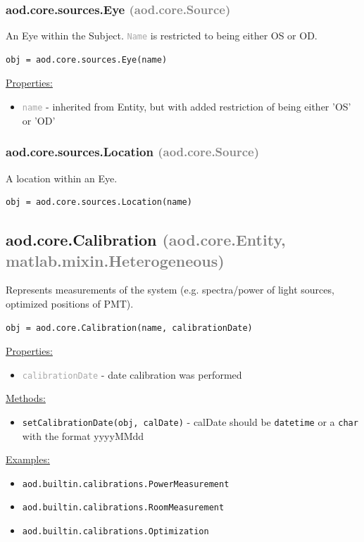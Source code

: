 \documentclass[10pt]{exam}
\newcommand\myparent[1]{\textcolor{gray}{(#1)}}
\newcommand\aodclass[1]{\textcolor{codeblue}{\texttt{#1}}}
\newcommand\aodprop[1]{\textcolor{darkgray}{\texttt{#1}}}
\newcommand\aodfcn[1]{\textcolor{darkteal}{\texttt{#1}}}
\newcommand\docheader[1]{\vspace{0.6ex}\noindent\underline{#1}\vspace{0.15ex}}
\begin{document}
		\subsubsection{aod.core.sources.Eye \textcolor{gray}{(aod.core.Source)}}
			\noindent An Eye within the Subject. \aodprop{Name} is restricted to being either OS or OD.
			\begin{lstlisting}[style=matlab-editor, basicstyle=\mlttfamily\footnotesize]
obj = aod.core.sources.Eye(name)
			\end{lstlisting} 
			\docheader{Properties:}
			\begin{itemize}
				\item \aodprop{name} - inherited from Entity, but with added restriction of being either 'OS' or 'OD'
			\end{itemize}
			
		\subsubsection{aod.core.sources.Location  	\textcolor{gray}{(aod.core.Source)}}
			\noindent A location within an Eye.
			\begin{lstlisting}[style=matlab-editor, basicstyle=\mlttfamily\footnotesize]
obj = aod.core.sources.Location(name)
			\end{lstlisting}
	
	\subsection{aod.core.Calibration \myparent{aod.core.Entity, matlab.mixin.Heterogeneous}}
		\label{subsection:CalibrationDoc}
		\noindent Represents measurements of the system (e.g. spectra/power of light sources, optimized positions of PMT). %
	
		\begin{lstlisting}[style=matlab-editor, basicstyle=\mlttfamily\footnotesize]
obj = aod.core.Calibration(name, calibrationDate)
		\end{lstlisting}
		\docheader{Properties:}
		\begin{itemize}
			\item \aodprop{calibrationDate} - date calibration was performed
		\end{itemize}
		\docheader{Methods:}
		\begin{itemize}
			\item \aodfcn{setCalibrationDate(obj, calDate)} - calDate should be \aodclass{datetime} or a \aodclass{char} with the format yyyyMMdd
		\end{itemize}
		\docheader{Examples:}
		\begin{itemize}
			\item \aodclass{aod.builtin.calibrations.PowerMeasurement}
			\item \aodclass{aod.builtin.calibrations.RoomMeasurement}
			\item \aodclass{aod.builtin.calibrations.Optimization}
		\end{itemize}
\end{document}
